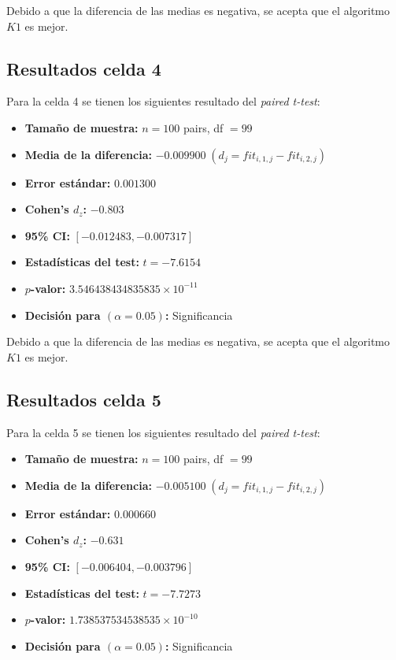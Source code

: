Debido a que la diferencia de las medias es negativa, se acepta que el algoritmo $K1$ es mejor.

\subsection{Resultados celda 4}
Para la celda 4 se tienen los siguientes resultado del \textit{paired t-test}:
\begin{itemize}
    \item \textbf{Tamaño de muestra:} $n=100$ pairs, df $=99$
    \item \textbf{Media de la diferencia:} $-0.009900 \; (d_j = fit_{i,1,j} - fit_{i,2,j})$
    \item \textbf{Error estándar:} $0.001300$
    \item \textbf{Cohen's $d_z$:} $-0.803$
    \item \textbf{95\% CI:} $[-0.012483, -0.007317]$
    \item \textbf{Estadísticas del test:} $t = -7.6154$
    \item \textbf{$p$-valor:} $3.546438434835835 \times 10^{-11}$
    \item \textbf{Decisión para $(\alpha = 0.05)$:} Significancia
\end{itemize}

Debido a que la diferencia de las medias es negativa, se acepta que el algoritmo $K1$ es mejor.

\subsection{Resultados celda 5}
Para la celda 5 se tienen los siguientes resultado del \textit{paired t-test}:
\begin{itemize}
    \item \textbf{Tamaño de muestra:} $n=100$ pairs, df $=99$
    \item \textbf{Media de la diferencia:} $-0.005100 \; (d_j = fit_{i,1,j} - fit_{i,2,j})$
    \item \textbf{Error estándar:} $0.000660$
    \item \textbf{Cohen's $d_z$:} $-0.631$
    \item \textbf{95\% CI:} $[-0.006404, -0.003796]$
    \item \textbf{Estadísticas del test:} $t = -7.7273$
    \item \textbf{$p$-valor:} $1.738537534538535 \times 10^{-10}$
    \item \textbf{Decisión para $(\alpha = 0.05)$:} Significancia
\end{itemize}

